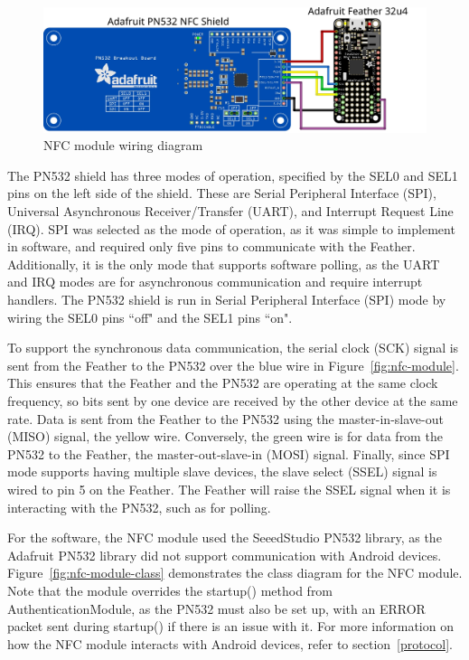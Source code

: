 \documentclass[12pt]{report}
\begin{document}
\begin{figure}
    \includegraphics[width=\textwidth]{Diagrams/Hardware-Diagrams/nfc_module}
    \caption{NFC module wiring diagram}
    \label{fig:nfc-module-wiring}
\end{figure}

The PN532 shield has three modes of operation, specified by the SEL0 and SEL1 pins on the left side of the shield. 
These are Serial Peripheral Interface (SPI), Universal Asynchronous Receiver/Transfer (UART), and Interrupt Request 
Line (IRQ). SPI was selected as the mode of operation, as it was simple to implement in software, and required only five 
pins to communicate with the Feather. Additionally, it is the only mode that supports software polling, as the UART 
and IRQ modes are for asynchronous communication and require interrupt handlers. The PN532 shield is run in Serial 
Peripheral Interface (SPI) mode by wiring the SEL0 pins ``off" and the SEL1 pins ``on".

To support the synchronous data communication, the serial clock (SCK) signal is sent from the Feather to the PN532 over 
the blue wire in Figure~\ref{fig:nfc-module}. This ensures that the Feather and the PN532 are operating at the same 
clock frequency, so bits sent by one device are received by the other device at the same rate. Data is sent from the 
Feather to the PN532 using the master-in-slave-out (MISO) signal, the yellow wire. Conversely, the green wire is for 
data from the PN532 to the Feather, the master-out-slave-in (MOSI) signal. Finally, since SPI mode supports having 
multiple slave devices, the slave select (SSEL) signal is wired to pin 5 on the Feather. The Feather will raise the 
SSEL signal when it is interacting with the PN532, such as for polling.

For the software, the NFC module used the SeeedStudio PN532 library, as the Adafruit PN532 library did not support 
communication with Android devices. Figure~\ref{fig:nfc-module-class} demonstrates the class diagram for the NFC 
module. Note that the module overrides the startup() method from AuthenticationModule, as the PN532 must also be set 
up, with an ERROR packet sent during startup() if there is an issue with it. For more information on how the NFC module 
interacts with Android devices, refer to section~\ref{protocol}.
\end{document}
